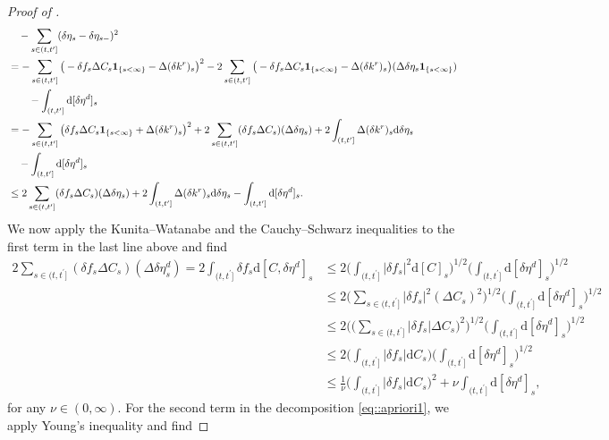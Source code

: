\documentclass[10pt]{article} %
\def\d{\mathrm{d}}
\begin{document}
\begin{proof}[Proof of ]
\begin{align}
	& \quad- \sum_{s \in (t,t^\prime]} (\delta\eta_s - \delta\eta_{s-})^2 \nonumber\\
	&= -\sum_{s \in (t,t^\prime]} \big( -\delta f_s \Delta C_s \mathbf{1}_{\{s < \infty\}} - \Delta (\delta k^r)_s \big)^2 -2\sum_{s \in (t,t^\prime]} \big(-\delta f_s \Delta C_s \mathbf{1}_{\{s < \infty\}} - \Delta (\delta k^r)_s \big)( \Delta \delta\eta_s \mathbf{1}_{\{s < \infty\}}) \nonumber\\
\nonumber	&\qquad- \int_{(t,t^\prime]} \d [\delta \eta^d]_s \\
	&= -\sum_{s \in (t,t^\prime]} \big( \delta f_s \Delta C_s\mathbf{1}_{\{s < \infty\}} + \Delta (\delta k^r)_s \big)^2 + 2\sum_{s \in (t,t^\prime]} (\delta f_s \Delta C_s)( \Delta \delta\eta_s) + 2\int_{(t,t^\prime]} \Delta (\delta k^r)_s \d \delta \eta_s\nonumber\\
	\notag&\quad - \int_{(t,t^\prime]} \d [\delta \eta^d]_s \nonumber\\
	&\leq  2\sum_{s \in (t,t^\prime]} (\delta f_s \Delta C_s)( \Delta \delta\eta_s) + 2\int_{(t,t^\prime]} \Delta (\delta k^r)_s \d \delta \eta_s - \int_{(t,t^\prime]} \d [\delta \eta^d]_s.  \label{eq::apriori2}
\end{align}
We now apply the Kunita--Watanabe and the Cauchy--Schwarz inequalities to the first term in the last line above and find
\begin{align}
	 2\sum_{s \in (t,t^\prime]} (\delta f_s \Delta C_s)( \Delta \delta\eta^d_s) =  2 \int_{(t,t^\prime]} \delta f_s \d [ C, \delta \eta^d]_s &\leq 2 \bigg( \int_{(t,t^\prime]} |\delta f_s|^2 \d [C]_s \bigg)^{1/2}\bigg(\int_{(t,t^\prime]} \d [\delta \eta^d]_s\bigg)^{1/2} \nonumber\\
	&\leq 2 \bigg( \sum_{s \in (t,t^\prime]} |\delta f_s|^2 (\Delta C_s)^2 \bigg)^{1/2}\bigg(\int_{(t,t^\prime]} \d [\delta \eta^d]_s\bigg)^{1/2} \nonumber\\
	&\leq 2 \Bigg(\bigg( \sum_{s \in (t,t^\prime]} |\delta f_s| \Delta C_s \bigg)^2\Bigg)^{1/2}\bigg(\int_{(t,t^\prime]} \d [\delta \eta^d]_s\bigg)^{1/2} \nonumber\\
	&\leq 2 \bigg( \int_{(t,t^\prime]} |\delta f_s| \d C_s \bigg) \bigg(\int_{(t,t^\prime]} \d [\delta \eta^d]_s\bigg)^{1/2} \nonumber\\
	&\leq \frac{1}{\nu} \bigg( \int_{(t,t^\prime]} |\delta f_s| \d C_s\bigg)^2 + \nu \int_{(t,t^\prime]} \d [\delta \eta^d]_s, \label{eq::apriori3}
\end{align}
for any $\nu \in (0,\infty)$. For the second term in the decomposition \eqref{eq::apriori1}, we apply Young's inequality and find

\end{proof}
\end{document}
